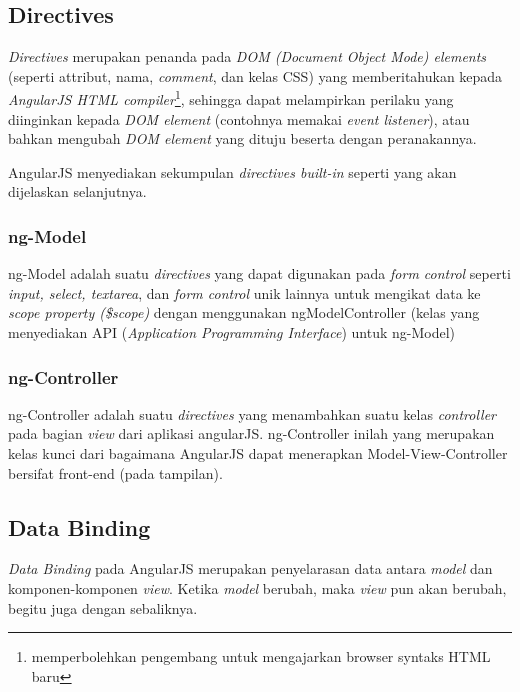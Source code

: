 \subsection{Directives}
\label{sub: directives}

	\textit{Directives} merupakan penanda pada \textit{DOM (Document Object Mode) elements} (seperti attribut, nama, \textit{comment},  dan kelas CSS) yang memberitahukan kepada \textit{AngularJS HTML compiler}\footnote{memperbolehkan pengembang untuk mengajarkan browser syntaks HTML baru}, sehingga dapat melampirkan perilaku yang diinginkan kepada \textit{DOM element} (contohnya memakai \textit{event listener}), atau bahkan mengubah \textit{DOM element} yang dituju beserta dengan peranakannya.
	
	AngularJS menyediakan sekumpulan \textit{directives built-in} seperti yang akan dijelaskan selanjutnya.
	
	\subsubsection{ng-Model}
	ng-Model adalah suatu \textit{directives} yang dapat digunakan pada \textit{form control} seperti \textit{input, select, textarea}, dan \textit{form control} unik lainnya untuk mengikat data ke \textit{scope property (\$scope)} dengan menggunakan ngModelController (kelas yang menyediakan API (\textit{Application Programming Interface}) untuk ng-Model)
	
	\subsubsection{ng-Controller}
	ng-Controller adalah suatu \textit{directives} yang menambahkan suatu kelas \textit{controller} pada bagian \textit{view} dari aplikasi angularJS. ng-Controller inilah yang merupakan kelas kunci dari bagaimana AngularJS dapat menerapkan Model-View-Controller bersifat front-end (pada tampilan).

\subsection{Data Binding}
\label{sub: dataBinding}
	
	\textit{Data Binding} pada AngularJS merupakan penyelarasan data antara \textit{model} dan komponen-komponen \textit{view}. Ketika \textit{model} berubah, maka \textit{view} pun akan berubah, begitu juga dengan sebaliknya.
	
